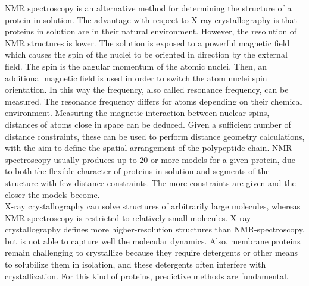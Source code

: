 \gls{NMR} spectroscopy is an alternative method for determining the structure of a protein in solution. The advantage with respect to X-ray crystallography is that proteins in solution are in their natural environment. However, the resolution of NMR structures is lower. The solution is exposed to a powerful magnetic field which causes the spin of the nuclei to be oriented in direction by the external field. The spin is the angular momentum of the atomic nuclei. Then, an additional magnetic field is used in order to switch the atom nuclei spin orientation. In this way the frequency, also called resonance frequency, can be measured. The resonance frequency differs for atoms depending on their chemical environment. Measuring the magnetic interaction between nuclear spins, distances of atoms close in space can be deduced. Given a sufficient number of distance constraints, these can be used to perform distance geometry calculations, with the aim to define the spatial arrangement of the polypeptide chain. NMR-spectroscopy usually produces up to $20$ or more models for a given protein, due to both the flexible character of proteins in solution and segments of the structure with few distance constraints. The more constraints are given and the closer the models become. \\
X-ray crystallography can solve structures of arbitrarily large molecules, whereas NMR-spectroscopy is restricted to relatively small molecules. X-ray crystallography defines more higher-resolution structures than NMR-spectroscopy, but is not able to capture well the molecular dynamics. Also, membrane proteins remain challenging to crystallize because they require detergents or other means to solubilize them in isolation, and these detergents often interfere with crystallization. For this kind of proteins, predictive methods are fundamental.


